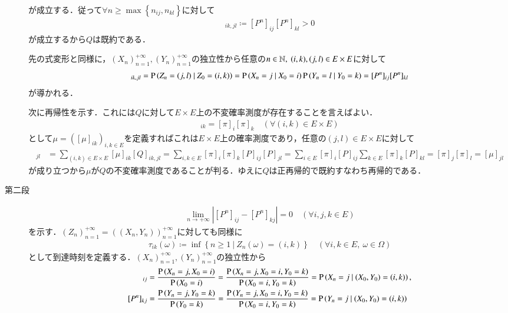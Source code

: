 \begin{prf}
\begin{description}
		が成立する．従って$\forall n \geq \max{}{\left\{n_{ij},n_{kl}\right\}}$に対して
		\begin{align}
			[Q^n]_{ik,jl} \coloneqq [P^n]_{ij}[P^n]_{kl} > 0
		\end{align}
		が成立するから$Q$は既約である．
		\begin{rem}
			先の式変形と同様に，$(X_n)_{n=1}^{+\infty}, (Y_n)_{n=1}^{+\infty}$の独立性から任意の$n \in \mathbb{N},\ (i,k),(j,l) \in E \times E$に対して
			\begin{align}
				[Q^n]_{ik,jl} = \cprob{Z_n = (j,l)}{Z_0=(i,k)} = \cprob{X_n = j}{X_0=i}\cprob{Y_n = l}{Y_0=k} = [P^n]_{ij}[P^n]_{kl}
			\end{align}
			が導かれる．
		\end{rem}
		次に再帰性を示す．これには$Q$に対して$E \times E$上の不変確率測度が存在することを言えばよい．
		\begin{align}
			[\mu]_{ik} = [\pi]_i[\pi]_k \quad (\forall (i,k) \in E \times E)
		\end{align}
		として$\mu = ([\mu]_{ik})_{i,k \in E}$を定義すればこれは$E \times E$上の確率測度であり，任意の$(j,l) \in E \times E$に対して
		\begin{align}
			[\mu Q]_{jl} &= \sum_{(i,k) \in E \times E} [\mu]_{ik} [Q]_{ik,jl} 
			= \sum_{i,k \in E} [\pi]_i[\pi]_k [P]_{ij}[P]_{jl} 
			= \sum_{i \in E} [\pi]_i[P]_{ij}\sum_{k \in E} [\pi]_k[P]_{kl} 
			= [\pi]_j[\pi]_l
			= [\mu]_{jl}
		\end{align}
		が成り立つから$\mu$が$Q$の不変確率測度であることが判る．ゆえに$Q$は正再帰的で既約すなわち再帰的である．
	\item[第二段]
		\begin{align}
			\lim_{n \to +\infty} \left| [P^n]_{ij} - [P^n]_{kj} \right| = 0 \quad (\forall i,j,k \in E) \label{eq:discrete_ergodic}
		\end{align}
		を示す．$(Z_n)_{n=1}^{+\infty} = ((X_n, Y_n))_{n=1}^{+\infty}$に対しても同様に
		\begin{align}
			\tau_{ik}(\omega) \coloneqq \inf{}{\left\{ n \geq 1\ \left|\ Z_n(\omega) = (i,k) \right.\right\}} \quad (\forall i,k \in E,\ \omega \in \Omega)
		\end{align}
		として到達時刻を定義する．$(X_n)_{n=1}^{+\infty}, (Y_n)_{n=1}^{+\infty}$の独立性から
		\begin{align}
			[P^n]_{ij} &= \frac{\prob{X_n=j,X_0=i}}{\prob{X_0=i}} = \frac{\prob{X_n=j,X_0=i,Y_0=k}}{\prob{X_0=i,Y_0=k}} = \cprob{X_n=j}{(X_0,Y_0)=(i,k)},\\
			[P^n]_{kj} &= \frac{\prob{Y_n=j,Y_0=k}}{\prob{Y_0=k}} = \frac{\prob{Y_n=j,X_0=i,Y_0=k}}{\prob{X_0=i,Y_0=k}} = \cprob{Y_n=j}{(X_0,Y_0)=(i,k)}

\end{align}
\end{description}
\end{prf}
